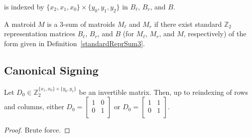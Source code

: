 \begin{definition}
    is indexed by $\{x_{2}, x_{1}, x_{0}\} \times \{y_{0}, y_{1}, y_{2}\}$ in $B_{\ell}$, $B_{r}$, and $B$.
\end{definition}

\begin{definition}
    \label{Matroid.IsSum3of}
    \leanok
    A matroid $M$ is a $3$-sum of matroids $M_{\ell}$ and $M_{r}$ if there exist standard $\mathbb{Z}_{2}$ representation matrices $B_{\ell}$, $B_{r}$, and $B$ (for $M_{\ell}$, $M_{r}$, and $M$, respectively) of the form given in Definition~\ref{standardReprSum3}.
\end{definition}


\subsection{Canonical Signing}

\begin{lemma}
    \label{Matrix.isUnit_2x2}
    \leanok
    Let $D_{0} \in \mathbb{Z}_{2}^{\{x_{1}, x_{0}\} \times \{y_{0}, y_{1}\}}$ be an invertible matrix. Then, up to reindexing of rows and columns, either $D_{0} = \begin{bmatrix} 1 & 0 \\ 0 & 1 \\ \end{bmatrix}$ or $D_{0} = \begin{bmatrix} 1 & 1 \\ 0 & 1 \\ \end{bmatrix}$.
\end{lemma}

\begin{proof}
    \leanok
    Brute force.
\end{proof}

